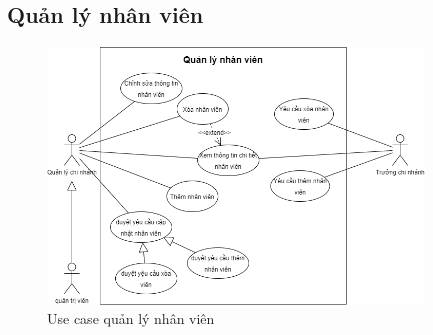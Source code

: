 \subsection{Quản lý nhân viên}
\begin{figure}[!htp]
    \begin{center}
        \includegraphics[width=10cm]{img/UseCase/UseCase-Quản lý nhân viên.drawio.png}
    \end{center}
    \caption{Use case quản lý nhân viên}
\end{figure}
\newpage


